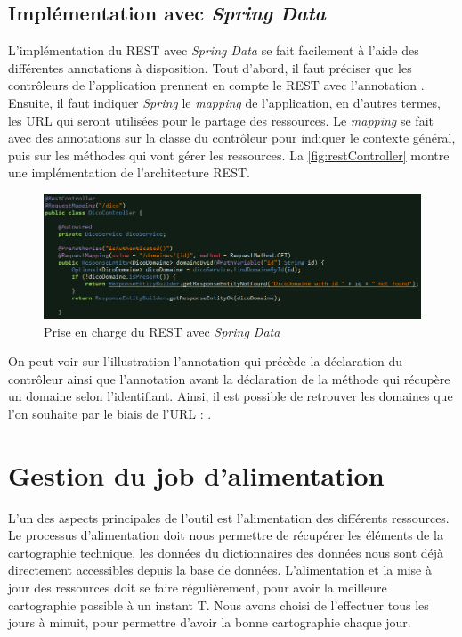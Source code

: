 \documentclass{polytech/polytech}
\begin{document}
\section{Implémentation avec \textit{Spring Data}}

L'implémentation du REST avec \textit{Spring Data} se fait facilement à l'aide des différentes annotations à disposition. Tout d'abord, il faut préciser que les contrôleurs de l'application prennent en compte le REST avec l'annotation . Ensuite, il faut indiquer \textit{Spring} le \textit{mapping} de l'application, en d'autres termes, les URL qui seront utilisées pour le partage des ressources. Le \textit{mapping} se fait avec des annotations  sur la classe du contrôleur pour indiquer le contexte général, puis sur les méthodes qui vont gérer les ressources. La \autoref{fig:restController} montre une implémentation de l'architecture REST.

\begin{figure}
	\includegraphics[scale=0.65]{images/restController}
	\caption{Prise en charge du REST avec \textit{Spring Data}}
	\label{fig:restController}
\end{figure}

On peut voir sur l'illustration l'annotation  qui précède la déclaration du contrôleur ainsi que l'annotation  avant la déclaration de la méthode qui récupère un domaine selon l'identifiant. Ainsi, il est possible de retrouver les domaines que l'on souhaite par le biais de l'URL : . 

\chapter{Gestion du job d'alimentation}


L'un des aspects principales de l'outil est l'alimentation des différents ressources. Le processus d'alimentation doit nous permettre de récupérer les éléments de la cartographie technique, les données du dictionnaires des données nous sont déjà directement accessibles depuis la base de données. L'alimentation et la mise à jour des ressources doit se faire régulièrement, pour avoir la meilleure cartographie possible à un instant T. Nous avons choisi de l'effectuer tous les jours à minuit, pour permettre d'avoir la bonne cartographie chaque jour. 
\end{document}
